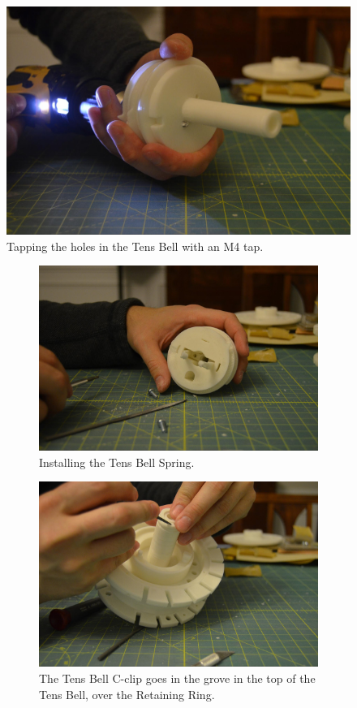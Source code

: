 \documentclass[openany]{book}
\begin{document}
\begin{figure}[!ht]
	\centering
	\includegraphics[width=.75\textwidth]{images/image54.jpg}
	\caption{Tapping the holes in the Tens Bell with an M4 tap.}
	\label{fig:image54}	
\end{figure}


\begin{figure}[!ht]
	\centering
	\begin{subfigure}{.4\textwidth}
		\centering
		\includegraphics[width=.95\textwidth]{images/image4.jpg}
		\caption{Installing the Tens Bell Spring.}
		\label{fig:image4}	
	\end{subfigure}
	\begin{subfigure}{.4\textwidth}
		\centering
		\includegraphics[width=.95\textwidth]{images/image47.jpg}
		\caption{The Tens Bell C-clip goes in the grove in the top of the Tens Bell, over the Retaining Ring.}
		\label{fig:image47}	
	\end{subfigure}
	\caption{}
\end{figure}
\end{document}
